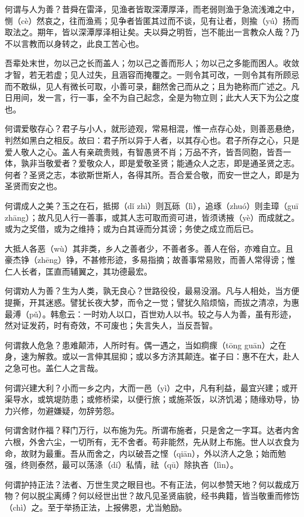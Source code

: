 \documentclass[12pt,UTF8]{ctexbook}
\begin{document}
何谓与人为善？昔舜在雷泽，见渔者皆取深潭厚泽，而老弱则渔于急流浅滩之中，恻（cè）然哀之，往而渔焉；见争者皆匿其过而不谈，见有让者，则揄（yú）扬而取法之。期年，皆以深潭厚泽相让矣。夫以舜之明哲，岂不能出一言教众人哉？乃不以言教而以身转之，此良工苦心也。

吾辈处末世，勿以己之长而盖人；勿以己之善而形人；勿以己之多能而困人。收敛才智，若无若虚；见人过失，且涵容而掩覆之。一则令其可改，一则令其有所顾忌而不敢纵，见人有微长可取，小善可录，翻然舍己而从之；且为艳称而广述之。凡日用间，发一言，行一事，全不为自己起念，全是为物立则；此大人天下为公之度也。

何谓爱敬存心？君子与小人，就形迹观，常易相混，惟一点存心处，则善恶悬绝，判然如黑白之相反。故曰：君子所以异于人者，以其存心也。君子所存之心，只是爱人敬人之心。盖人有亲疏贵贱，有智愚贤不肖；万品不齐，皆吾同胞，皆吾一体，孰非当敬爱者？爱敬众人，即是爱敬圣贤；能通众人之志，即是通圣贤之志。何者？圣贤之志，本欲斯世斯人，各得其所。吾合爱合敬，而安一世之人，即是为圣贤而安之也。

何谓成人之美？玉之在石，抵掷（dǐ zhì）则瓦砾（lì），追琢（zhuó）则圭璋（guī zhāng）；故凡见人行一善事，或其人志可取而资可进，皆须诱掖（yè）而成就之。或为之奖借，或为之维持；或为白其诬而分其谤；务使之成立而后已。

大抵人各恶（wù）其非类，乡人之善者少，不善者多。善人在俗，亦难自立。且豪杰铮（zhēng）铮，不甚修形迹，多易指摘；故善事常易败，而善人常得谤；惟仁人长者，匡直而辅翼之，其功德最宏。

何谓劝人为善？生为人类，孰无良心？世路役役，最易没溺。凡与人相处，当方便提撕，开其迷惑。譬犹长夜大梦，而令之一觉；譬犹久陷烦恼，而拔之清凉，为惠最溥（pǔ）。韩愈云：一时劝人以口，百世劝人以书。较之与人为善，虽有形迹，然对证发药，时有奇效，不可废也；失言失人，当反吾智。

何谓救人危急？患难颠沛，人所时有。偶一遇之，当如痌瘝（tōng  guān）之在身，速为解救。或以一言伸其屈抑；或以多方济其颠连。崔子曰：惠不在大，赴人之急可也。盖仁人之言哉。

何谓兴建大利？小而一乡之内，大而一邑（yì）之中，凡有利益，最宜兴建；或开渠导水，或筑堤防患；或修桥梁，以便行旅；或施茶饭，以济饥渴；随缘劝导，协力兴修，勿避嫌疑，勿辞劳怨。

何谓舍财作福？释门万行，以布施为先。所谓布施者，只是舍之一字耳。达者内舍六根，外舍六尘，一切所有，无不舍者。苟非能然，先从财上布施。世人以衣食为命，故财为最重。吾从而舍之，内以破吾之悭（qiān），外以济人之急；始而勉强，终则泰然，最可以荡涤（dí）私情，祛（qū）除执吝（lìn）。

何谓护持正法？法者、万世生灵之眼目也。不有正法，何以参赞天地？何以裁成万物？何以脱尘离缚？何以经世出世？故凡见圣贤庙貌，经书典籍，皆当敬重而修饬（chì）之。至于举扬正法，上报佛恩，尤当勉励。
\end{document}
